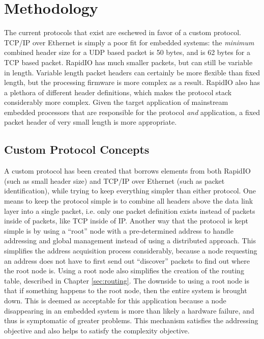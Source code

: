 \section{Methodology} \label{sec:protocol:methodology}

The current protocols that exist are eschewed in favor of a custom protocol. TCP/IP over Ethernet is simply a poor fit for embedded systems: the \emph{minimum} combined header size for a UDP based packet is 50 bytes, and is 62 bytes for a TCP based packet. RapidIO has much smaller packets, but can still be variable in length. Variable length packet headers can certainly be more flexible than fixed length, but the processing firmware is more complex as a result. RapidIO also has a plethora of different header definitions, which makes the protocol stack considerably more complex. Given the target application of mainstream embedded processors that are responsible for the protocol \emph{and} application, a fixed packet header of very small length is more appropriate.

\subsection{Custom Protocol Concepts}\label{sec:protocol:methodology:concepts}

A custom protocol has been created that borrows elements from both RapidIO (such as small header size) and TCP/IP over Ethernet (such as packet identification), while trying to keep everything simpler than either protocol. One means to keep the protocol simple is to combine all headers above the data link layer into a single packet, i.e. only one packet definition exists instead of packets inside of packets, like TCP inside of IP. Another way that the protocol is kept simple is by using a ``root'' node with a pre-determined address to handle addressing and global management instead of using a distributed approach. This simplifies the address acquisition process considerably, because a node requesting an address does not have to first send out ``discover'' packets to find out where the root node is. Using a root node also simplifies the creation of the routing table, described in Chapter \ref{sec:routing}. The downside to using a root node is that if something happens to the root node, then the entire system is brought down. This is deemed as acceptable for this application because a node disappearing in an embedded system is more than likely a hardware failure, and thus is symptomatic of greater problems. This mechanism satisfies the addressing objective and also helps to satisfy the complexity objective.

